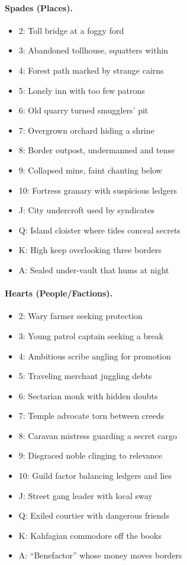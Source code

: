 \documentclass[12pt]{book}
\begin{document}
\paragraph{Spades (Places).}
\begin{itemize}
  \item 2: Toll bridge at a foggy ford
  \item 3: Abandoned tollhouse, squatters within
  \item 4: Forest path marked by strange cairns
  \item 5: Lonely inn with too few patrons
  \item 6: Old quarry turned smugglers’ pit
  \item 7: Overgrown orchard hiding a shrine
  \item 8: Border outpost, undermanned and tense
  \item 9: Collapsed mine, faint chanting below
  \item 10: Fortress granary with suspicious ledgers
  \item J: City undercroft used by syndicates
  \item Q: Island cloister where tides conceal secrets
  \item K: High keep overlooking three borders
  \item A: Sealed under-vault that hums at night
\end{itemize}

\paragraph{Hearts (People/Factions).}
\begin{itemize}
  \item 2: Wary farmer seeking protection
  \item 3: Young patrol captain seeking a break
  \item 4: Ambitious scribe angling for promotion
  \item 5: Traveling merchant juggling debts
  \item 6: Sectarian monk with hidden doubts
  \item 7: Temple advocate torn between creeds
  \item 8: Caravan mistress guarding a secret cargo
  \item 9: Disgraced noble clinging to relevance
  \item 10: Guild factor balancing ledgers and lies
  \item J: Street gang leader with local sway
  \item Q: Exiled courtier with dangerous friends
  \item K: Kahfagian commodore off the books
  \item A: ``Benefactor'' whose money moves borders
\end{itemize}
\end{document}
